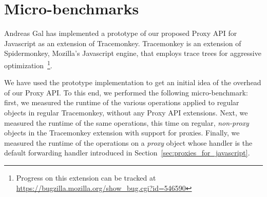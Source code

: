 \documentclass{acm_proc_article-sp}
\begin{document}
\section{Micro-benchmarks}
\label{sub:benchmarks}

Andreas Gal has implemented a prototype of our proposed Proxy API for Javascript as an extension of Tracemonkey. Tracemonkey is an extension of Spidermonkey, Mozilla's Javascript engine, that employs trace trees for aggressive optimization~\cite{gal06efficient}\footnote{Progress on this extension can be tracked at \url{https://bugzilla.mozilla.org/show_bug.cgi?id=546590}}.

We have used the prototype implementation to get an initial idea of the overhead of our Proxy API. To this end, we performed the following micro-benchmark: first, we measured the runtime of the various operations applied to regular objects in regular Tracemonkey, without any Proxy API extensions. Next, we measured the runtime of the same operations, this time on regular, \emph{non-proxy} objects in the Tracemonkey extension with support for proxies. Finally, we measured the runtime of the operations on a \emph{proxy} object whose handler is the default forwarding handler introduced in Section~\ref{sec:proxies_for_javascript}.
\end{document}
